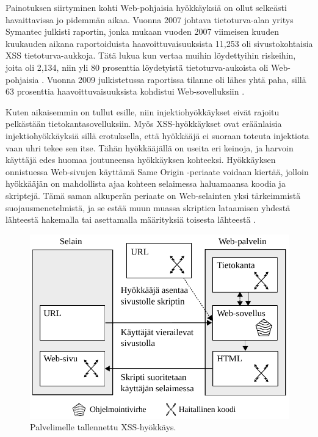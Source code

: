 Painotuksen siirtyminen kohti Web-pohjaisia hyökkäyksiä on ollut selkeästi havaittavissa jo pidemmän aikaa. Vuonna 2007 johtava tietoturva-alan 
yritys Symantec julkisti raportin, jonka  mukaan vuoden 2007 viimeisen kuuden kuukauden aikana raportoiduista haavoittuvaisuuksista 11,253
oli sivustokohtaisia XSS tietoturva-aukkoja. Tätä lukua kun vertaa muihin löydettyihin riskeihin, joita oli 2,134, niin 
yli 80 prosenttia löydetyistä tietoturva-aukoista oli Web-pohjaisia \cite{SYM}. Vuonna 2009 julkistetussa raportissa tilanne oli lähes yhtä paha, 
sillä 63 prosenttia haavoittuvaisuuksista kohdistui Web-sovelluksiin \cite{SYM2}.

Kuten aikaisemmin on tullut esille, niin injektiohyökkäykset eivät rajoitu pelkästään tietokantasovelluksiin. Myös XSS-hyökkäykset ovat eräänlaisia 
injektiohyökkäyksiä sillä erotuksella, että hyökkääjä ei suoraan toteuta injektiota vaan uhri tekee sen itse. Tähän hyökkääjällä on useita eri 
keinoja, ja harvoin käyttäjä edes huomaa joutuneensa hyökkäyksen kohteeksi. Hyökkäyksen onnistuessa Web-sivujen käyttämä Same Origin -pe\-ri\-aa\-te 
voidaan kiertää, jolloin hyökkääjän on mahdollista ajaa kohteen selaimessa haluamaansa koodia ja skriptejä. Tämä saman alkuperän periaate on Web-selainten 
yksi tärkeimmistä suojausmenetelmistä, ja se estää muun muassa skriptien lataamisen yhdestä lähteestä hakemalla tai asettamalla määrityksiä toisesta lähteestä \cite{WEB2}.

\begin{figure}[htp]
\centering
\includegraphics[width=12cm]{pics/tallennettu.pdf}
\caption{Palvelimelle tallennettu XSS-hyökkäys.}
\label{tallennettu}
\end{figure}

